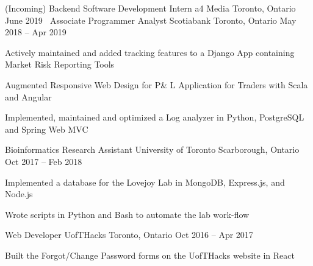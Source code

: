 \begin{cventries}
  \cventry
    {(Incoming) Backend Software Development Intern}
    {a4 Media}
    {Toronto, Ontario}
    {June 2019}
    {
      $\:$
    }
  \cventry
    {Associate Programmer Analyst}
    {Scotiabank}
    {Toronto, Ontario}
    {May 2018 -- Apr 2019}
    {
      \begin{cvitems}
        \item {Actively maintained and added tracking features to a Django App containing Market Risk Reporting Tools}
        \item {Augmented Responsive Web Design for P\& L Application for Traders with Scala and Angular}
        \item {Implemented, maintained and optimized a Log analyzer in Python, PostgreSQL and Spring Web MVC}
      \end{cvitems}
    }

  \cventry
    {Bioinformatics Research Assistant}
    {University of Toronto}
    {Scarborough, Ontario}
    {Oct 2017 -- Feb 2018}
    {
      \begin{cvitems}
        \item {Implemented a database for the Lovejoy Lab in MongoDB, Express.js, and Node.js}
        \item {Wrote scripts in Python and Bash to automate the lab work-flow}
      \end{cvitems}
    }
  \cventry
    {Web Developer}
    {UofTHacks}
    {Toronto, Ontario}
    {Oct 2016 -- Apr 2017}
    {
      \begin{cvitems}
        \item {Built the Forgot/Change Password forms on the UofTHacks website in React}
      \end{cvitems}
    }
\end{cventries}
